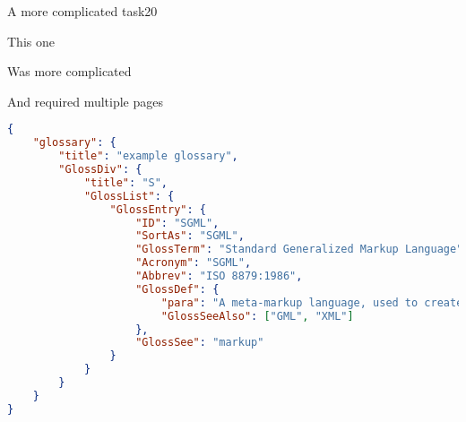 \begin{task}{A more complicated task}{20}

This one

\pagebreak

Was more complicated 

\pagebreak

And required multiple pages
\end{task}



\begin{frame}[containsverbatim]
	\begin{lstlisting}[language=json,firstnumber=1,basicstyle=\tiny]
{
    "glossary": {
        "title": "example glossary",
		"GlossDiv": {
            "title": "S",
			"GlossList": {
                "GlossEntry": {
                    "ID": "SGML",
					"SortAs": "SGML",
					"GlossTerm": "Standard Generalized Markup Language",
					"Acronym": "SGML",
					"Abbrev": "ISO 8879:1986",
					"GlossDef": {
                        "para": "A meta-markup language, used to create markup languages such as DocBook.",
						"GlossSeeAlso": ["GML", "XML"]
                    },
					"GlossSee": "markup"
                }
            }
        }
    }
}
	\end{lstlisting}		
	\end{frame}

